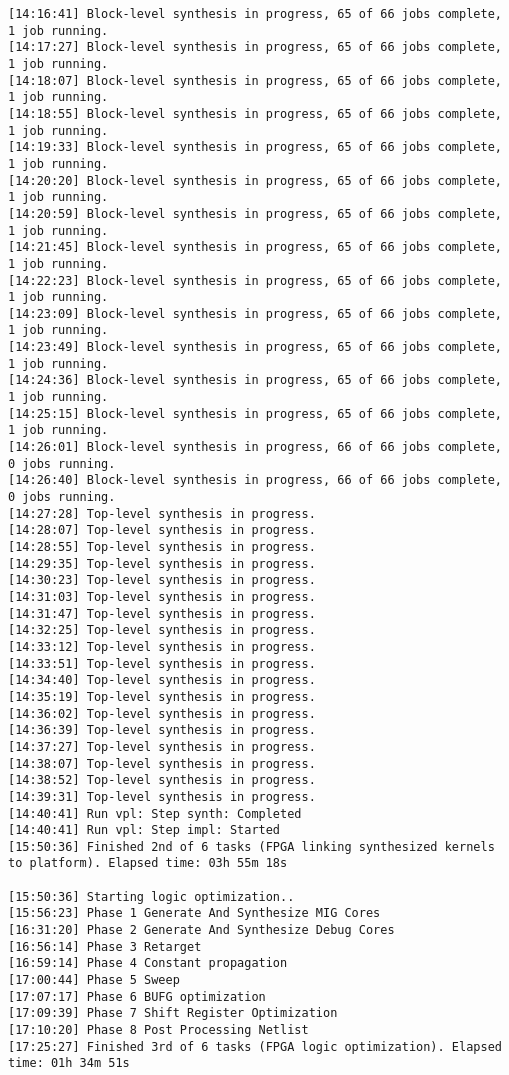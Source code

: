\begin{lstlisting}[label=func,breaklines=true,breakatwhitespace=false,caption=СОДЕРЖИМОЕ LOG-ФАЙЛА.]
[14:16:41] Block-level synthesis in progress, 65 of 66 jobs complete, 1 job running.
[14:17:27] Block-level synthesis in progress, 65 of 66 jobs complete, 1 job running.
[14:18:07] Block-level synthesis in progress, 65 of 66 jobs complete, 1 job running.
[14:18:55] Block-level synthesis in progress, 65 of 66 jobs complete, 1 job running.
[14:19:33] Block-level synthesis in progress, 65 of 66 jobs complete, 1 job running.
[14:20:20] Block-level synthesis in progress, 65 of 66 jobs complete, 1 job running.
[14:20:59] Block-level synthesis in progress, 65 of 66 jobs complete, 1 job running.
[14:21:45] Block-level synthesis in progress, 65 of 66 jobs complete, 1 job running.
[14:22:23] Block-level synthesis in progress, 65 of 66 jobs complete, 1 job running.
[14:23:09] Block-level synthesis in progress, 65 of 66 jobs complete, 1 job running.
[14:23:49] Block-level synthesis in progress, 65 of 66 jobs complete, 1 job running.
[14:24:36] Block-level synthesis in progress, 65 of 66 jobs complete, 1 job running.
[14:25:15] Block-level synthesis in progress, 65 of 66 jobs complete, 1 job running.
[14:26:01] Block-level synthesis in progress, 66 of 66 jobs complete, 0 jobs running.
[14:26:40] Block-level synthesis in progress, 66 of 66 jobs complete, 0 jobs running.
[14:27:28] Top-level synthesis in progress.
[14:28:07] Top-level synthesis in progress.
[14:28:55] Top-level synthesis in progress.
[14:29:35] Top-level synthesis in progress.
[14:30:23] Top-level synthesis in progress.
[14:31:03] Top-level synthesis in progress.
[14:31:47] Top-level synthesis in progress.
[14:32:25] Top-level synthesis in progress.
[14:33:12] Top-level synthesis in progress.
[14:33:51] Top-level synthesis in progress.
[14:34:40] Top-level synthesis in progress.
[14:35:19] Top-level synthesis in progress.
[14:36:02] Top-level synthesis in progress.
[14:36:39] Top-level synthesis in progress.
[14:37:27] Top-level synthesis in progress.
[14:38:07] Top-level synthesis in progress.
[14:38:52] Top-level synthesis in progress.
[14:39:31] Top-level synthesis in progress.
[14:40:41] Run vpl: Step synth: Completed
[14:40:41] Run vpl: Step impl: Started
[15:50:36] Finished 2nd of 6 tasks (FPGA linking synthesized kernels to platform). Elapsed time: 03h 55m 18s 

[15:50:36] Starting logic optimization..
[15:56:23] Phase 1 Generate And Synthesize MIG Cores
[16:31:20] Phase 2 Generate And Synthesize Debug Cores
[16:56:14] Phase 3 Retarget
[16:59:14] Phase 4 Constant propagation
[17:00:44] Phase 5 Sweep
[17:07:17] Phase 6 BUFG optimization
[17:09:39] Phase 7 Shift Register Optimization
[17:10:20] Phase 8 Post Processing Netlist
[17:25:27] Finished 3rd of 6 tasks (FPGA logic optimization). Elapsed time: 01h 34m 51s 


\end{lstlisting}
